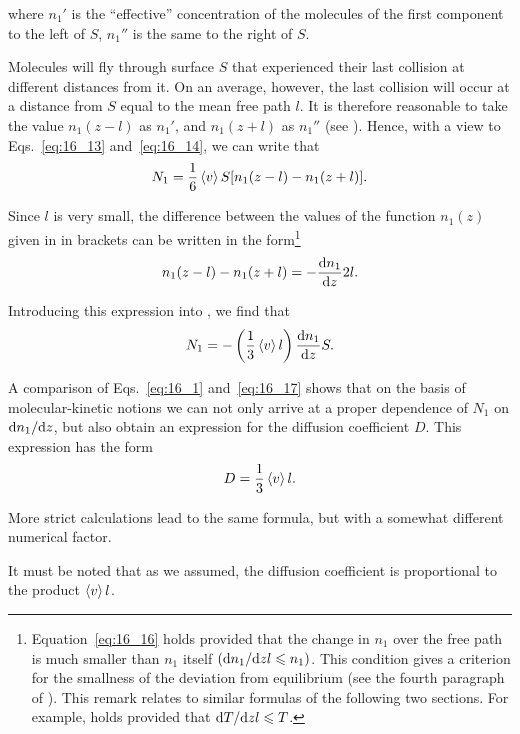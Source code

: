 \noindent
where $n_1'$ is the ``effective'' concentration of the molecules of the first component to the left of $S$, $n_1''$ is the same to the right of $S$.

Molecules will fly through surface $S$ that experienced their last collision at different distances from it. On an average, however, the last collision will occur at a distance from $S$ equal to the mean free path $l$. It is therefore reasonable to take the value $n_1(z-l)$ as $n_1'$, and $n_1(z+l)$ as $n_1''$ (see ). Hence, with a view to Eqs.~\eqref{eq:16_13} and~\eqref{eq:16_14}, we can write that
\begin{equation}\label{eq:16_15}
    N_1 = \frac{1}{6}\left\langle v \right\rangle S [n_1(z-l) - n_1(z+l)].
\end{equation}

Since $l$ is very small, the difference between the values of the function $n_1(z)$ given in  in brackets can be written in the
form\footnote{Equation~\eqref{eq:16_16} holds provided that the change in $n_1$ over the free path is much smaller than $n_1$ itself $(\mathrm{d} n_1/\mathrm{d} zl\leqslant n_1)$. This condition gives a criterion for the smallness of the deviation from equilibrium (see the fourth paragraph of ). This remark relates to similar formulas of the following two sections. For example,  holds provided that $\mathrm{d} T/\mathrm{d} zl\leqslant T$.}
\begin{equation}\label{eq:16_16}
    n_1(z-l) - n_1(z+l) = - \frac{\mathrm{d} n_1}{\mathrm{d} z}2l.
\end{equation}

\noindent
Introducing this expression into , we find that
\begin{equation}\label{eq:16_17}
    N_1 = - \left(\frac{1}{3} \left\langle v \right\rangle l\right)\frac{\mathrm{d} n_1}{\mathrm{d} z} S.
\end{equation}

A comparison of Eqs.~\eqref{eq:16_1} and~\eqref{eq:16_17} shows that on the basis of molecular-kinetic notions we can not only arrive at a proper dependence of $N_1$ on $\mathrm{d} n_1/\mathrm{d} z$, but also obtain an expression for the diffusion coefficient $D$. This expression has the form
\begin{equation}\label{eq:16_18}
    D = \frac{1}{3} \left\langle v \right\rangle l.
\end{equation}

\noindent
More strict calculations lead to the same formula, but with a somewhat different numerical factor.

It must be noted that as we assumed, the diffusion coefficient is proportional to the product $\left\langle v \right\rangle l$.

